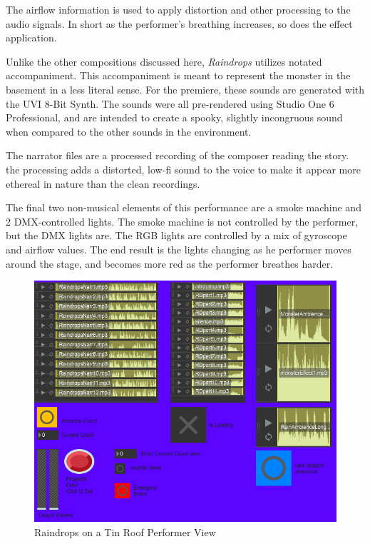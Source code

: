 The airflow information is used to apply distortion and other processing to the audio signals. In short as the performer's breathing increases, so does the effect application.

Unlike the other compositions discussed here, \textit{Raindrops} utilizes notated accompaniment. This accompaniment is meant to represent the monster in the basement in a less literal sense. For the premiere, these sounds are generated with the UVI 8-Bit Synth. The sounds were all pre-rendered using Studio One 6 Professional, and are intended to create a spooky, slightly incongruous sound when compared to the other sounds in the environment. 

The narrator files are a processed recording of the composer reading the story. the processing adds a distorted, low-fi sound to the voice to make it appear more ethereal in nature than the clean recordings. 

The final two non-musical elements of this performance are a smoke machine and 2 DMX-controlled lights. The smoke machine is not controlled by the performer, but the DMX lights are. The RGB lights are controlled by a mix of gyroscope and airflow values. The end result is the lights changing as he performer moves around the stage, and becomes more red as the performer breathes harder.

\begin{figure}
    \centering
    \includegraphics{diagrams/maxPatches/raindropspres.png}
    \caption{Raindrops on a Tin Roof Performer View}
    \label{fig:raindropsPres}
\end{figure}

